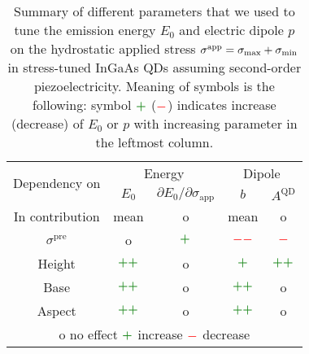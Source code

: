\begin{table*}[ht!]
	\begin{center}
		\caption{Summary of different parameters that we used to tune the emission energy $E_0$ and electric dipole $p$ on the hydrostatic applied stress $\sigma^{\rm{app}}=\sigma_{\mathrm{max}}+\sigma_{\mathrm{min}}$ in stress-tuned InGaAs QDs assuming second-order piezoelectricity. Meaning of symbols is the following: symbol $\textcolor{ps_green}{\boldsymbol{+}}$ ($\textcolor{red}{\boldsymbol{-}}$) indicates increase (decrease) of $E_0$ or $p$ with increasing parameter in the leftmost column.  \label{tab:conclusion_straintuned} 
		}
		\begin{tabular}{c|cc|cc}
			\hline \hline
			\multirow{2}{*}{Dependency on} &  \multicolumn{2}{c|}{Energy} & \multicolumn{2}{c}{Dipole}\\ \cline{2-5}
			 &   $E_0$ & $\partial E_0/\partial\sigma_\mathrm{app}$  & $b$ & $A^{\mathrm{QD}}$\\  \hline
			  In contribution &  mean & o  & mean &o\\ \hline
			 $\sigma^\mathrm{pre}$ &  o &  $\textcolor{ps_green}{\boldsymbol{+}}$  & $\textcolor{red}{\boldsymbol{--}}$ &$\textcolor{red}{\boldsymbol{-}}$\\ \hline
			 Height&  $\textcolor{ps_green}{\boldsymbol{++}}$&  o  & $\textcolor{ps_green}{\boldsymbol{+}}$ &$\textcolor{ps_green}{\boldsymbol{++}}$\\ \hline
			 Base &  $\textcolor{ps_green}{\boldsymbol{++}}$&  o   &$\textcolor{ps_green}{\boldsymbol{++}}$ & o\\ \hline
			 Aspect &  $\textcolor{ps_green}{\boldsymbol{++}}$&  o   &$\textcolor{ps_green}{\boldsymbol{++}}$ & o\\ \hline
			 \multicolumn{5}{c}{o no effect \qquad $\textcolor{ps_green}{\boldsymbol{+}}$ increase \qquad $\textcolor{red}{\boldsymbol{-}}$ decrease }\\
			\hline \hline
		\end{tabular}
	\end{center}
\end{table*}


